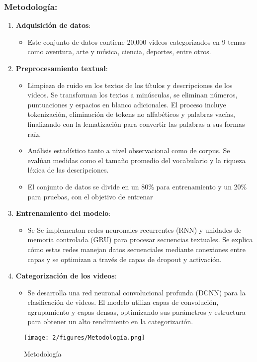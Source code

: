 \subsubsection {Metodología: }
	\begin{enumerate}
		\item \textbf{Adquisición de datos}: 
		\begin{itemize}
			\item Este conjunto de datos contiene 20,000 videos categorizados en 9 temas como aventura, arte y música, ciencia, deportes, entre otros.
		\end{itemize}
		
		\item \textbf{Preprocesamiento textual}:
		\begin{itemize}
			\item Limpieza de ruido en los textos de los títulos y descripciones de los videos. Se transforman los textos a minúsculas, se eliminan números, puntuaciones y espacios en blanco adicionales. El proceso incluye tokenización, eliminación de tokens no alfabéticos y palabras vacías, finalizando con la lematización para convertir las palabras a sus formas raíz.
			\item Análisis estadístico tanto a nivel observacional como de corpus. Se evalúan medidas como el tamaño promedio del vocabulario y la riqueza léxica de las descripciones.
			\item  El conjunto de datos se divide en un 80\% para entrenamiento y un 20\% para pruebas, con el objetivo de entrenar
			\end{itemize}
		
		\item \textbf{Entrenamiento del modelo}:
		\begin{itemize}
			\item Se Se implementan redes neuronales recurrentes (RNN) y unidades de memoria controlada (GRU) para procesar secuencias textuales. Se explica cómo estas redes manejan datos secuenciales mediante conexiones entre capas y se optimizan a través de capas de dropout y activación.
		\end{itemize}
		
		\item \textbf{Categorización de los videos}:
		\begin{itemize}
			\item Se desarrolla una red neuronal convolucional profunda (DCNN) para la clasificación de videos. El modelo utiliza capas de convolución, agrupamiento y capas densas, optimizando sus parámetros y estructura para obtener un alto rendimiento en la categorización.
		\end{itemize}
	\end{enumerate}
	\begin{figure}[h]
		\centering
		\texttt{[image: 2/figures/Metodología.png]}
		\caption{Metodología}
		\label{fig:etiqueta_de_la_figura}
	\end{figure}

